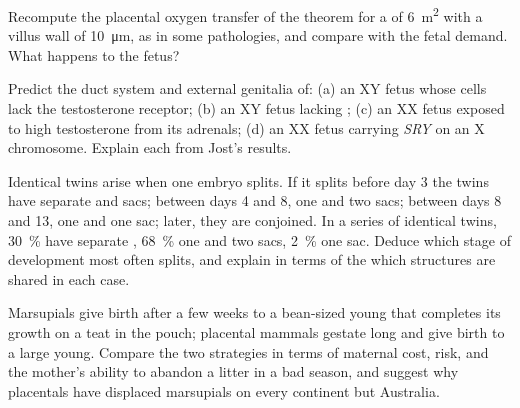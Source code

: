 \begin{exercise}[$\star\star$]\label{exo:b2:mammal-reproduction:9}
Recompute the placental oxygen transfer of the theorem for a
 of \qty{6}{m^2} with a villus wall of \qty{10}{\micro m}, as
in some pathologies, and compare with the fetal demand. What happens
to the fetus?
\end{exercise}

\begin{exercise}[$\star\star\star$]\label{exo:b2:mammal-reproduction:10}
Predict the duct system and external genitalia of: (a) an XY fetus
whose cells lack the testosterone receptor; (b) an XY fetus lacking
; (c) an XX fetus exposed to high testosterone
from its adrenals; (d) an XX fetus carrying \emph{SRY} on an X
chromosome. Explain each from Jost's results.
\end{exercise}

\begin{exercise}[$\star\star\star$]\label{exo:b2:mammal-reproduction:11}
Identical twins arise when one embryo splits. If it splits before
day 3 the twins have separate  and sacs; between days 4 and
8, one  and two sacs; between days 8 and 13, one  and
one sac; later, they are conjoined. In a series of identical twins,
\qty{30}{\%} have separate , \qty{68}{\%} one  and
two sacs, \qty{2}{\%} one sac. Deduce which stage of development
most often splits, and explain in terms of the  which
structures are shared in each case.
\end{exercise}

\begin{exercise}[$\star\star\star$]\label{exo:b2:mammal-reproduction:12}
Marsupials give birth after a few weeks to a bean-sized young that
completes its growth on a teat in the pouch; placental mammals
gestate long and give birth to a large young. Compare the two
strategies in terms of maternal cost, risk, and the mother's ability
to abandon a litter in a bad season, and suggest why placentals
have displaced marsupials on every continent but Australia.
\end{exercise}

